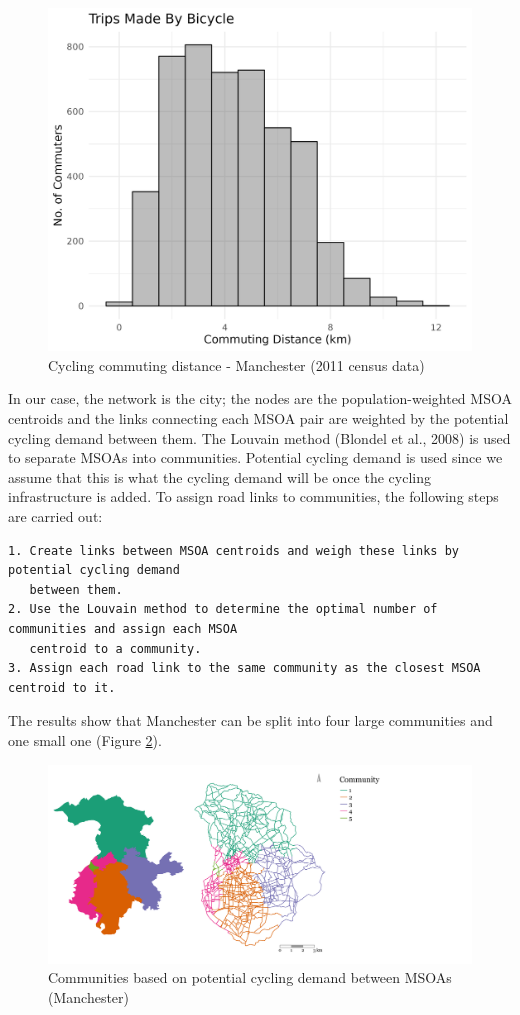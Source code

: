 \documentclass[
]{article}
\begin{document}
\begin{figure}

{\centering \includegraphics[width=0.4\linewidth]{data/Manchester/Plots/histogram_distance_cycling} 

}

\caption{Cycling commuting distance - Manchester (2011 census data)}\label{fig:cyclinghistmanc}
\end{figure}

In our case, the network is the city; the nodes are the
population-weighted MSOA centroids and the links connecting each MSOA
pair are weighted by the potential cycling demand between them. The
Louvain method (Blondel et al., 2008) is used to separate MSOAs into
communities. Potential cycling demand is used since we assume that this
is what the cycling demand will be once the cycling infrastructure is
added. To assign road links to communities, the following steps are
carried out:

\begin{verbatim}
1. Create links between MSOA centroids and weigh these links by potential cycling demand 
   between them.
2. Use the Louvain method to determine the optimal number of communities and assign each MSOA 
   centroid to a community.
3. Assign each road link to the same community as the closest MSOA centroid to it.
\end{verbatim}

The results show that Manchester can be split into four large
communities and one small one (Figure \ref{fig:communitiesmanchester}).

\begin{figure}

{\centering \includegraphics[width=0.8\linewidth]{data/Manchester/Plots/communities_alternative_Manchester} 

}

\caption{Communities based on potential cycling demand between MSOAs (Manchester)}\label{fig:communitiesmanchester}
\end{figure}
\end{document}
